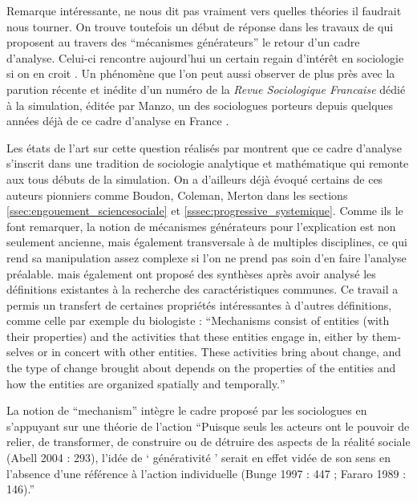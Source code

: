 Remarque intéressante, \textcite{Conte2007} ne nous dit pas vraiment vers quelles théories il faudrait nous tourner. On trouve toutefois un début de réponse dans les travaux de \textcites{Hedstrom2010, Manzo2007, Elsenbroich2012} qui proposent au travers des \enquote{mécanismes générateurs} le retour d'un cadre d'analyse. Celui-ci rencontre aujourd'hui un certain regain d'intérêt en sociologie si on en croit \textcites{Berger2010, Hedstrom2010}. Un phénomène que l'on peut aussi observer de plus près avec la parution récente et inédite  d'un numéro de la \textit{Revue Sociologique Francaise} dédié à la simulation, éditée par Manzo, un des sociologues porteurs depuis quelques années déjà de ce cadre d'analyse en France \autocite{Manzo2005, Manzo2007}.

Les états de l'art sur cette question réalisés par \textcites{Manzo2005,Manzo2007, Hedstrom1998, Berger2010} montrent que ce cadre d'analyse s'inscrit dans une tradition de sociologie analytique et mathématique qui remonte aux tous débuts de la simulation. On a d'ailleurs déjà évoqué certains de ces auteurs pionniers comme Boudon, Coleman, Merton dans les sections \ref{ssec:engouement_sciencesociale} et \ref{sssec:progressive_systemique}. Comme ils le font remarquer, la notion de mécanismes générateurs pour l'explication est non seulement ancienne, mais également transversale à de multiples disciplines, ce qui rend sa manipulation assez complexe si l'on ne prend pas soin d'en faire l'analyse préalable. \textcite{Hedstrom2010} mais également \textcite{Manzo2005} ont proposé des synthèses après avoir analysé les définitions existantes à la recherche des caractéristiques communes. Ce travail a permis un transfert de certaines propriétés intéressantes à d'autres définitions, comme celle par exemple du biologiste \textcite{Machamer2000} : \foreignquote{english}{Mechanisms consist of entities (with their properties) and the activities that these entities engage in, either by themselves or in concert with other entities. These activities bring about change, and the type of change brought about depends on the properties of the entities and how the entities are organized spatially and temporally.}

La notion de \foreignquote{english}{mechanism} intègre le cadre proposé par les sociologues en s'appuyant sur une théorie de l'action \enquote{Puisque seuls les acteurs ont le pouvoir de relier, de transformer, de construire ou de détruire des aspects de la réalité sociale (Abell 2004 : 293), l’idée de  \enquote{ générativité } serait en effet vidée de son sens en l’absence d’une référence à l’action individuelle (Bunge 1997 : 447 ; Fararo 1989 : 146).}

